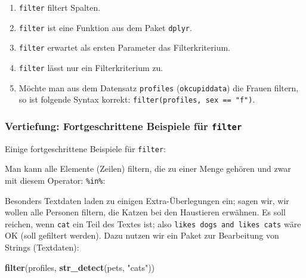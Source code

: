\documentclass[12pt,ngerman,]{book}
\makeatletter
\newenvironment{Shaded}{\begin{snugshade}}{\end{snugshade}}
\newcommand{\KeywordTok}[1]{\textcolor[rgb]{0.13,0.29,0.53}{\textbf{{#1}}}}
\newcommand{\StringTok}[1]{\textcolor[rgb]{0.31,0.60,0.02}{{#1}}}
\newcommand{\NormalTok}[1]{{#1}}
\providecommand{\tightlist}{%
  \setlength{\itemsep}{0pt}\setlength{\parskip}{0pt}}
\newenvironment{kframe}{%
\medskip{}
\setlength{\fboxsep}{.8em}
 \def\at@end@of@kframe{}%
 \ifinner\ifhmode%
  \def\at@end@of@kframe{\end{minipage}}%
  \begin{minipage}{\columnwidth}%
 \fi\fi%
 \def\FrameCommand##1{\hskip\@totalleftmargin \hskip-\fboxsep
 \colorbox{shadecolor}{##1}\hskip-\fboxsep
     \hskip-\linewidth \hskip-\@totalleftmargin \hskip\columnwidth}%
 \MakeFramed {\advance\hsize-\width
   \@totalleftmargin\z@ \linewidth\hsize
   \@setminipage}}%
 {\par\unskip\endMakeFramed%
 \at@end@of@kframe}
\renewenvironment{Shaded}{\begin{kframe}}{\end{kframe}}
\theoremstyle{definition}
\theoremstyle{definition}
\theoremstyle{remark}
\makeatother
\begin{document}
\begin{enumerate}
\def\labelenumi{\arabic{enumi}.}
\tightlist
\item
  \texttt{filter} filtert Spalten.
\item
  \texttt{filter} ist eine Funktion aus dem Paket \texttt{dplyr}.
\item
  \texttt{filter} erwartet als ersten Parameter das Filterkriterium.
\item
  \texttt{filter} lässt nur ein Filterkriterium zu.
\item
  Möchte man aus dem Datensatz \texttt{profiles} (\texttt{okcupiddata})
  die Frauen filtern, so ist folgende Syntax korrekt:
  \texttt{filter(profiles,\ sex\ ==\ "f")}.
\end{enumerate}

\subsubsection{\texorpdfstring{Vertiefung: Fortgeschrittene Beispiele
für
\texttt{filter}}{Vertiefung: Fortgeschrittene Beispiele für filter}}\label{vertiefung-fortgeschrittene-beispiele-fur-filter}

Einige fortgeschrittene Beispiele für \texttt{filter}:

Man kann alle Elemente (Zeilen) filtern, die zu einer Menge gehören und
zwar mit diesem Operator: \texttt{\%in\%}:

\begin{Shaded}
\end{Shaded}

Besonders Textdaten laden zu einigen Extra-Überlegungen ein; sagen wir,
wir wollen alle Personen filtern, die Katzen bei den Haustieren
erwähnen. Es soll reichen, wenn \texttt{cat} ein Teil des Textes ist;
also \texttt{likes\ dogs\ and\ likes\ cats} wäre OK (soll gefiltert
werden). Dazu nutzen wir ein Paket zur Bearbeitung von Strings
(Textdaten):

\begin{Shaded}
\begin{Highlighting}[]

\KeywordTok{filter}\NormalTok{(profiles, }\KeywordTok{str_detect}\NormalTok{(pets, }\StringTok{"cats"}\NormalTok{))}
\end{Highlighting}
\end{Shaded}
\end{document}
